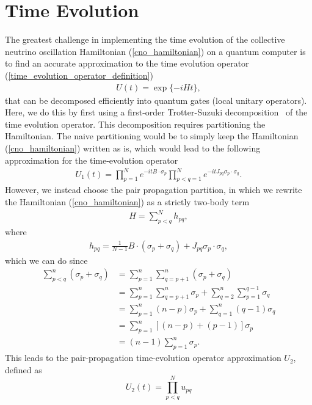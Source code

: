 \documentclass[10pt]{article}
\begin{document}
\section{Time Evolution}
\label{sec:real_time}

The greatest challenge in implementing the time evolution of the collective neutrino oscillation Hamiltonian (\ref{cno_hamiltonian}) on a quantum computer is to find an accurate approximation to the time evolution operator (\ref{time_evolution_operator_definition})
\begin{align}
 U(t)=\exp\{-iHt\}  
,\end{align}
that can be decomposed efficiently into quantum gates (local unitary operators)\cite{Lloyd96}. Here, we do this by first using a first-order Trotter-Suzuki decomposition~\cite{Suzuki91} of the time evolution operator. This decomposition requires partitioning the Hamiltonian. The naive partitioning would be to simply keep the Hamiltonian (\ref{cno_hamiltonian}) written as is, which would lead to the following approximation for the time-evolution operator 
\begin{align}
\label{eq:trotter1}
U_1(t)=\prod_{p=1}^Ne^{-itB\cdot\sigma_p}\prod_{p<q=1}^Ne^{-it J_{pq}\sigma_p\cdot\sigma_q}
.\end{align}
However, we instead choose the pair propagation partition, in which we rewrite the Hamiltonian (\ref{cno_hamiltonian}) as a strictly two-body term
\begin{align}
\label{eq:ham_decomp}
H = \sum_{p<q}^N h_{pq}
,\end{align}
where
\begin{align}
h_{pq} = \frac{1}{N-1}B\cdot(\sigma_p+\sigma_q) + J_{pq}\sigma_p\cdot\sigma_q
,\end{align}
which we can do since
\begin{align}
\sum_{p<q}^n(\sigma_p+\sigma_q)
&=
\sum_{p=1}^n\sum_{q=p+1}^n(\sigma_p+\sigma_q) 
\nonumber 
\\
&=
\sum_{p=1}^n\sum_{q=p+1}^n\sigma_p+\sum_{q=2}^n\sum_{p=1}^{q-1}\sigma_q
\nonumber 
\\
&=
\sum_{p=1}^n(n-p)\sigma_p+\sum_{q=1}^n(q-1)\sigma_q
\nonumber 
\\
&=
\sum_{p=1}^n\left[(n-p)+(p-1)\right]\sigma_p 
\nonumber 
\\
&=(n-1)\sum_{p=1}^n\sigma_p
.\end{align}
This leads to the pair-propagation time-evolution operator approximation $U_2$, defined as
\begin{equation}
\label{eq:pair_prop_app}
U_2(t) = \prod_{p<q}^N u_{pq}
\end{equation}
\end{document}
